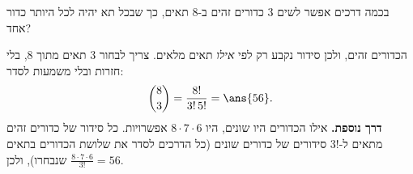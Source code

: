 בכמה דרכים אפשר לשים 3 כדורים זהים ב-8 תאים, כך שבכל תא יהיה לכל היותר כדור אחד?
\begin{solbox}
הכדורים זהים, ולכן סידור נקבע רק לפי \emph{אילו} תאים מלאים. צריך לבחור 3 תאים מתוך 8, בלי חזרות ובלי משמעות לסדר:
\[
\binom83=\frac{8!}{3!\,5!}=\ans{56}.
\]
\textbf{דרך נוספת.} אילו הכדורים היו שונים, היו $8\cdot7\cdot6$ אפשרויות. כל סידור של כדורים זהים מתאים ל-$3!$ סידורים של כדורים שונים (כל הדרכים לסדר את שלושת הכדורים בתאים שנבחרו), ולכן $\frac{8\cdot7\cdot6}{3!}=56$.
\end{solbox}
